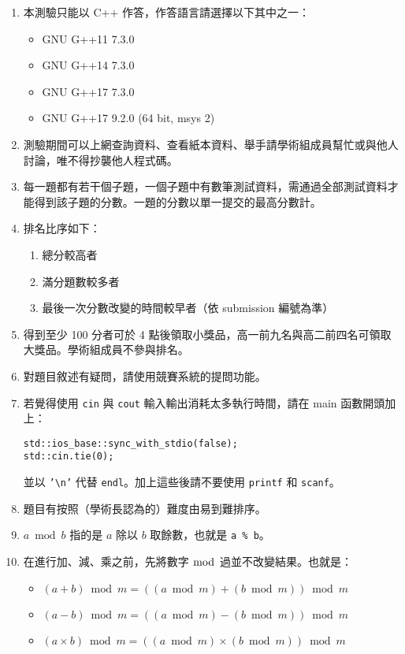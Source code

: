 \documentclass[12pt]{article}
\begin{document}
\begin{enumerate}
    \item 本測驗只能以 C++ 作答，作答語言請選擇以下其中之一：
    \begin{itemize}
        \item GNU G++11 7.3.0
        \item GNU G++14 7.3.0
        \item GNU G++17 7.3.0
        \item GNU G++17 9.2.0 (64 bit, msys 2)
    \end{itemize}
    \item 測驗期間可以上網查詢資料、查看紙本資料、舉手請學術組成員幫忙或與他人討論，唯不得抄襲他人程式碼。
    \item 每一題都有若干個子題，一個子題中有數筆測試資料，需通過全部測試資料才能得到該子題的分數。一題的分數以單一提交的最高分數計。
    \item 排名比序如下：
    \begin{enumerate}
        \item 總分較高者
        \item 滿分題數較多者
        \item 最後一次分數改變的時間較早者（依 submission 編號為準）
    \end{enumerate}
    \item 得到至少 100 分者可於 4 點後領取小獎品，高一前九名與高二前四名可領取大獎品。學術組成員不參與排名。
    \item 對題目敘述有疑問，請使用競賽系統的提問功能。
    \item 若覺得使用 \texttt{cin} 與 \texttt{cout} 輸入輸出消耗太多執行時間，請在 main 函數開頭加上：
\begin{lstlisting}
std::ios_base::sync_with_stdio(false);
std::cin.tie(0);
\end{lstlisting}
    並以 \texttt{'{\textbackslash}n'} 代替 \texttt{endl}。加上這些後請不要使用 \texttt{printf} 和 \texttt{scanf}。
    \item 題目有按照（學術長認為的）難度由易到難排序。
    \item $a \bmod b$ 指的是 $a$ 除以 $b$ 取餘數，也就是 \texttt{a \% b}。
    \item 在進行加、減、乘之前，先將數字 $\bmod$ 過並不改變結果。也就是：
    \begin{itemize}
        \item $(a + b) \bmod m = ((a \bmod m) + (b \bmod m)) \bmod m$
        \item $(a - b) \bmod m = ((a \bmod m) - (b \bmod m)) \bmod m$
        \item $(a \times b) \bmod m = ((a \bmod m) \times (b \bmod m)) \bmod m$
    \end{itemize}
\end{enumerate}
\end{document}
